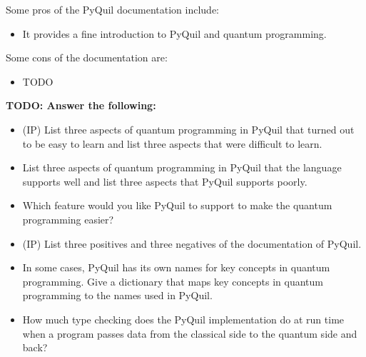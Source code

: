 \documentclass[12pt]{article}
\begin{document}


Some pros of the PyQuil documentation include:
\begin{itemize}
    \item It provides a fine introduction to PyQuil and quantum programming.
\end{itemize}

Some cons of the documentation are:
\begin{itemize}
    \item TODO
\end{itemize}

\textbf{TODO: Answer the following:}
\begin{itemize}
    \item (IP) List three aspects of quantum programming in PyQuil that turned out to be easy to learn and list three aspects that were difficult to learn.
    \item List three aspects of quantum programming in PyQuil that the language supports well and list three aspects that PyQuil supports poorly.
    \item Which feature would you like PyQuil to support to make the quantum programming easier?  
    \item (IP) List three positives and three negatives of the documentation of PyQuil.
    \item In some cases, PyQuil has its own names for key concepts in quantum programming.  Give a dictionary that maps key concepts in quantum programming to the names used in PyQuil.
    \item How much type checking does the PyQuil implementation do at run time when a program passes data from the classical side to the quantum side and back?
\end{itemize}

\end{document}

